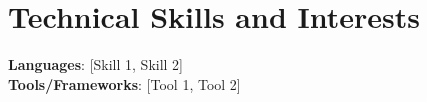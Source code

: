 \documentclass[a4paper,11pt]{article}
\begin{document}
\section{\textbf{Technical Skills and Interests}}
 \begin{itemize}[leftmargin=0.05in, label={}]
    \small{\item{
     \textbf{Languages}{: [Skill 1, Skill 2] } \\
     \textbf{Tools/Frameworks}{: [Tool 1, Tool 2] }\\ 
    }}
 \end{itemize}
 \vspace{-16pt}
\end{document}

